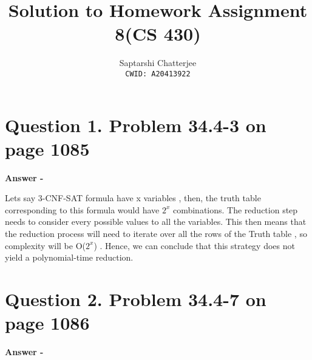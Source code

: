 \documentclass[5pt]{article}
\title{Solution to Homework Assignment 8(CS 430)}
\author{Saptarshi Chatterjee \\
\texttt{CWID: A20413922}
}
\begin{document}
\maketitle


\section{Question 1. Problem 34.4-3 on page 1085}

\setlength{\parskip}{1.2em}
\setlength{\parindent}{0em}

\textbf{Answer -}

Lets say 3-CNF-SAT formula have x variables , then, the truth table corresponding
to this formula would have $2^x$ combinations.  The reduction step needs to
consider every possible values to all the variables. This then means that
the reduction process will need to iterate over all the rows of the Truth table , so complexity 
will be O($2^x$) . Hence, we can conclude that this strategy does not yield a polynomial-time reduction.


\section{Question 2.  Problem 34.4-7 on page 1086}

\setlength{\parskip}{1.2em}
\setlength{\parindent}{0em}

\textbf{Answer -}
\end{document}
